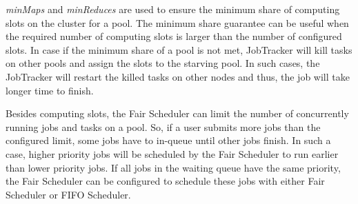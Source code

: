 \emph{minMaps} and \emph{minReduces} are used to ensure the minimum share of computing slots on the cluster for a pool. The minimum share guarantee can be useful when the required number of computing slots is larger than the number of configured slots. In case if the minimum share of a pool is not met, JobTracker will kill tasks on other pools and assign the slots to the starving pool. In such cases, the JobTracker will restart the killed tasks on other nodes and thus, the job will take longer time to finish.

Besides computing slots, the Fair Scheduler can limit the number of concurrently running jobs and tasks on a pool. So, if a user submits more jobs than the configured limit, some jobs have to in-queue until other jobs finish. In such a case, higher priority jobs will be scheduled by the Fair Scheduler to run earlier than lower priority jobs. If all jobs in the waiting queue have the same priority, the Fair Scheduler can be configured to schedule these jobs with either Fair Scheduler or FIFO Scheduler.

